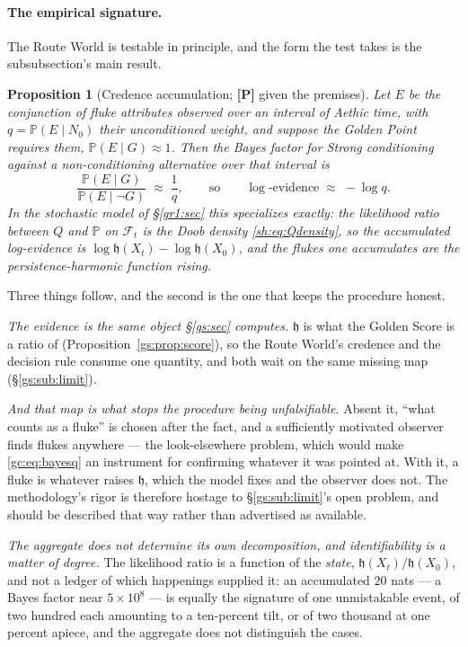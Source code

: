\documentclass[11pt]{article}
\numberwithin{equation}{section}
\theoremstyle{plain}
\newtheorem{proposition}[theorem]{Proposition}
\theoremstyle{definition}
\theoremstyle{remark}
\newcommand{\PP}{\mathbb{P}}
\newcommand{\Fc}{\mathcal{F}}
\newcommand{\hm}{\mathfrak{h}}
\begin{document}
\paragraph{The empirical signature.} The Route World is testable in
principle, and the form the test takes is the subsubsection's main
result.

\begin{proposition}[Credence accumulation; \textbf{[P]} given the
premises]\label{gc:prop:credence}
Let $E$ be the conjunction of fluke attributes observed over an interval
of Aethic time, with $q=\PP(E\mid N_0)$ their unconditioned weight, and
suppose the Golden Point requires them, $\PP(E\mid G)\approx1$. Then the
Bayes factor for Strong conditioning against a non-conditioning
alternative over that interval is
\begin{equation}\label{gc:eq:bayesq}
\frac{\PP(E\mid G)}{\PP(E\mid \neg G)}\;\approx\;\frac1q,
\qquad\text{so}\qquad
\log\text{-evidence}\;\approx\;-\log q .
\end{equation}
In the stochastic model of \S\ref{gr1:sec} this specializes exactly:
the likelihood ratio between $Q$ and $\PP$ on $\Fc_t$ is the Doob
density \eqref{sh:eq:Qdensity}, so the accumulated log-evidence is
$\log\hm(X_t)-\log\hm(X_0)$, and \emph{the flukes one accumulates are
the persistence-harmonic function rising}.
\end{proposition}

Three things follow, and the second is the one that keeps the procedure
honest.

\emph{The evidence is the same object \S\ref{gs:sec} computes.} $\hm$ is
what the Golden Score is a ratio of (Proposition~\ref{gs:prop:score}),
so the Route World's credence and the decision rule consume one
quantity, and both wait on the same missing map
(\S\ref{gs:sub:limit}).

\emph{And that map is what stops the procedure being unfalsifiable.}
Absent it, ``what counts as a fluke'' is chosen after the fact, and a
sufficiently motivated observer finds flukes anywhere --- the
look-elsewhere problem, which would make \eqref{gc:eq:bayesq} an
instrument for confirming whatever it was pointed at. With it, a fluke
is whatever raises $\hm$, which the model fixes and the observer does
not. The methodology's rigor is therefore hostage to
\S\ref{gs:sub:limit}'s open problem, and should be described that way
rather than advertised as available.

\emph{The aggregate does not determine its own decomposition, and
identifiability is a matter of degree.} The likelihood ratio is a
function of the \emph{state}, $\hm(X_t)/\hm(X_0)$, and not a ledger of
which happenings supplied it: an accumulated $20$ nats --- a Bayes factor
near $5\times10^{8}$ --- is equally the signature of one unmistakable
event, of two hundred each amounting to a ten-percent tilt, or of two
thousand at one percent apiece, and the aggregate does not distinguish
the cases.
\end{document}
